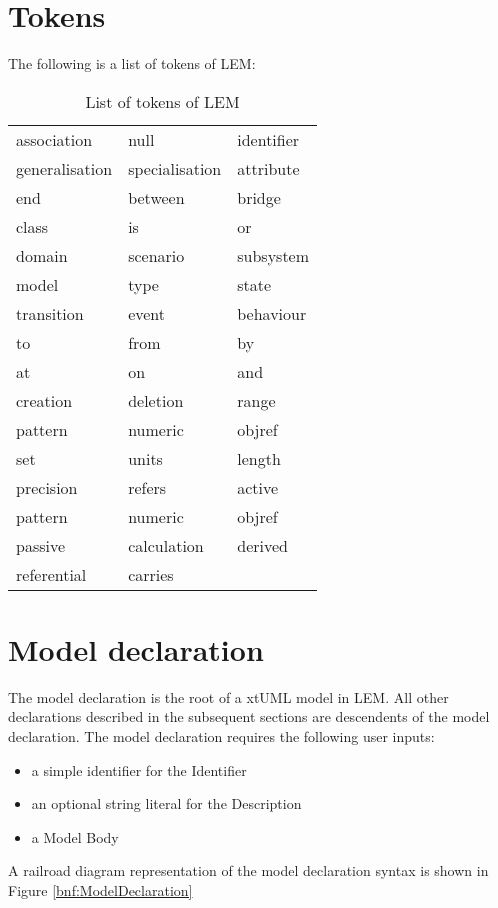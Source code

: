 \section{Tokens}
The following is a list of tokens of LEM:
\begin{table}[!ht]
\begin{center}
\begin{tabular}{lll}
association & null & identifier\\
generalisation & specialisation & attribute\\
end & between & bridge\\
class & is & or\\
domain & scenario & subsystem\\
model & type & state\\
transition & event & behaviour\\
to & from & by\\
at & on & and\\
creation & deletion & range\\
pattern & numeric & objref\\
set & units & length\\
precision & refers & active\\
pattern & numeric & objref\\
passive & calculation & derived\\
referential & carries & 
\end{tabular}
\end{center}
\caption{List of tokens of LEM}
\end{table}
                

\section{Model declaration}
The model declaration is the root of a xtUML model in LEM. All other declarations described in the subsequent sections are descendents of the model declaration. The model declaration requires the following user inputs:

\begin{itemize}
\item a simple identifier for the Identifier
\item an optional string literal for the Description
\item a Model Body
\end{itemize}

A railroad diagram representation of the model declaration syntax is shown in Figure \ref{bnf:ModelDeclaration}

